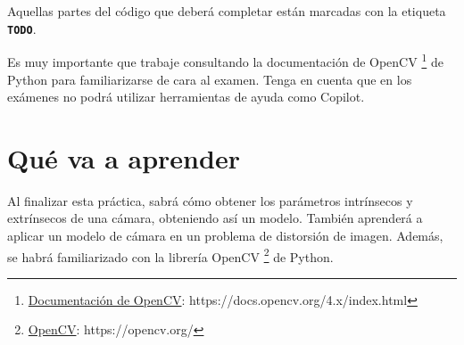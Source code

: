 Aquellas partes del código que deberá completar están marcadas con la etiqueta \textbf{\texttt{TODO}}.

Es muy importante que trabaje consultando la documentación de OpenCV \footnote{\href{https://docs.opencv.org/4.x/index.html}{Documentación de OpenCV}: https://docs.opencv.org/4.x/index.html} de Python para familiarizarse de cara al examen. Tenga en cuenta que en los exámenes no podrá utilizar herramientas de ayuda como Copilot.

\section{Qué va a aprender}

Al finalizar esta práctica, sabrá cómo obtener los parámetros intrínsecos y extrínsecos de una cámara, obteniendo así un modelo. También aprenderá a aplicar un modelo de cámara en un problema de distorsión de imagen. Además, se habrá familiarizado con la librería OpenCV \footnote{\href{https://opencv.org/}{OpenCV}: https://opencv.org/} de Python.